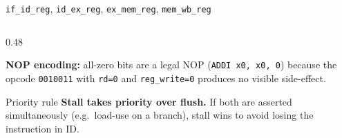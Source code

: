 \documentclass[aspectratio=169,10pt]{beamer}
\begin{document}
\begin{frame}{\texttt{if\_id\_reg}, \texttt{id\_ex\_reg}, \texttt{ex\_mem\_reg}, \texttt{mem\_wb\_reg}}
\begin{columns}[T]
\begin{column}{0.48\textwidth}

      \vspace{0.5em}
      \small
      \textbf{NOP encoding:} all-zero bits are a legal NOP (\texttt{ADDI x0, x0, 0}) because the opcode \texttt{0010011} with \texttt{rd=0} and \texttt{reg\_write=0} produces no visible side-effect.

      \vspace{0.4em}
      \begin{alertblock}{Priority rule}
        \small
        \textbf{Stall takes priority over flush.} If both are asserted simultaneously (e.g.\ load-use on a branch), stall wins to avoid losing the instruction in ID.
      \end{alertblock}
    \end{column}
  \end{columns}
\end{frame}
\end{document}
